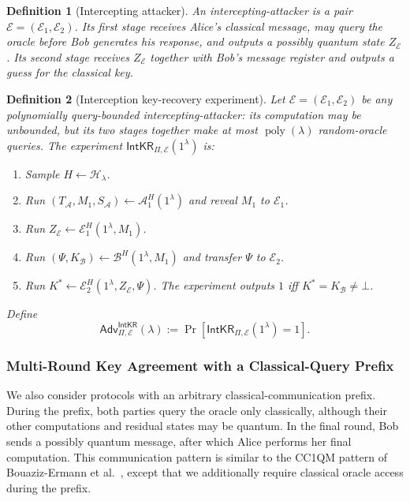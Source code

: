 \documentclass[11pt]{article}
\newtheorem{definition}[definition]{Definition}
\newcommand{\cA}{\mathcal{A}}
\newcommand{\cB}{\mathcal{B}}
\newcommand{\cE}{\mathcal{E}}
\newcommand{\cH}{\mathcal{H}}
\newcommand{\poly}{\operatorname{poly}}
\newcommand{\IntKR}{\mathsf{IntKR}}
\newcommand{\Adv}{\mathsf{Adv}}
\begin{document}
\begin{definition}[Intercepting attacker]
An \emph{intercepting-attacker} is a pair
\(\cE=(\cE_{1},\cE_{2})\). Its first stage receives
Alice's classical message, may query the oracle before Bob generates his
response, and outputs a possibly quantum state \(Z_{\cE}\). Its second stage
receives \(Z_{\cE}\) together with Bob's message register and outputs a guess for the
classical key.
\end{definition}

\begin{definition}[Interception key-recovery experiment]\label{def:intkr}
Let \(\cE=(\cE_{1},\cE_{2})\) be any polynomially
query-bounded intercepting-attacker: its computation may be
unbounded, but its two stages together make at most \(\poly(\lambda)\)
random-oracle queries.  The experiment
\(\IntKR_{\Pi,\cE}(1^\lambda)\) is:
\begin{enumerate}[leftmargin=2em]
  \item Sample \(H\leftarrow\cH_\lambda\).
  \item Run
  \((T_{\cA},M_1,S_{\cA})\leftarrow\cA_1^H(1^\lambda)\) and reveal
  \(M_1\) to \(\cE_{1}\).
  \item Run
  \(Z_{\cE}\leftarrow\cE_{1}^H(1^\lambda,M_1)\).
  \item Run
  \((\Psi,K_{\cB})\leftarrow\cB^H(1^\lambda,M_1)\) and transfer
  \(\Psi\) to \(\cE_{2}\).
  \item Run
  \(K^*\leftarrow\cE_{2}^H(1^\lambda,Z_{\cE},\Psi)\).
  The experiment outputs \(1\) iff \(K^*=K_{\cB}\neq\bot\).
\end{enumerate}
Define
\[
  \Adv^{\IntKR}_{\Pi,\cE}(\lambda)
  :=
  \Pr[\IntKR_{\Pi,\cE}(1^\lambda)=1].
\]
\end{definition}

\subsubsection{Multi-Round Key Agreement with a Classical-Query Prefix}

We also consider protocols with an arbitrary classical-communication prefix.
During the prefix, both parties query the oracle only
classically, although their other computations and residual states may be
quantum. In the final round, Bob sends a possibly quantum message, after
which Alice performs her final computation. This communication pattern is similar to
the CC1QM pattern of Bouaziz-Ermann et
al.~\cite[Definition~11]{BouazizEtAl24}, except that we additionally require classical
oracle access during the prefix.
\end{document}
